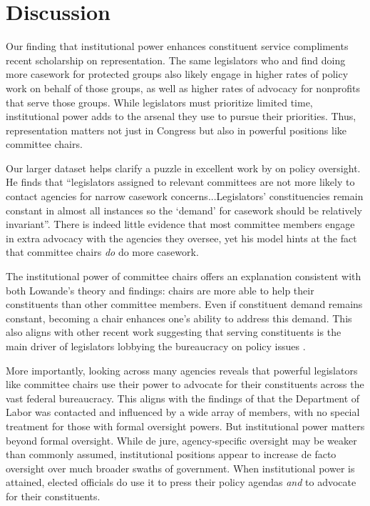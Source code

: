 \documentclass{article}
\begin{document}
\section{Discussion}

Our finding that institutional power enhances constituent service compliments recent scholarship on representation.
The same legislators who \citet{Grose2011} and \citet{LowandeRitchieLauterbach2018} find doing more casework for protected groups also likely engage in higher rates of policy work on behalf of those groups, as well as higher rates of advocacy for nonprofits that serve those groups. While legislators must prioritize limited time, institutional power adds to the arsenal they use to pursue their priorities. Thus, representation matters not just in Congress but also in powerful positions like committee chairs. 

Our larger dataset helps clarify a puzzle in excellent work by \citet{Lowande2018JOP} on policy oversight. He finds that ``legislators assigned to relevant committees are not more likely to contact agencies for narrow casework concerns...Legislators' constituencies remain constant in almost all instances so the `demand' for casework should be relatively invariant''\citep[pg 17-18]{Lowande2018JOP}. There is indeed little evidence that most committee members engage in extra advocacy with the agencies they oversee, yet his model hints at the fact that committee chairs \textit{do} do more casework. 

The institutional power of committee chairs offers an explanation consistent with both Lowande's theory and findings: chairs are more able to help their constituents than other committee members. Even if constituent demand remains constant, becoming a chair enhances one's ability to address this demand. This also aligns with other recent work suggesting that serving constituents is the main driver of legislators lobbying the bureaucracy on policy issues \citep{Ritchie2017}.

More importantly, looking across many agencies reveals that powerful legislators like committee chairs use their power to advocate for their constituents across the vast federal bureaucracy. This aligns with the findings of \citet{RitchieYou2018} that the Department of Labor was contacted and influenced by a wide array of members, with no special treatment for those with formal oversight powers. But institutional power matters beyond formal oversight. While de jure, agency-specific oversight may be weaker than commonly assumed, institutional positions appear to increase de facto oversight over much broader swaths of government. When institutional power is attained, elected officials do use it to press their policy agendas \emph{and} to advocate for their constituents.






\end{document}
